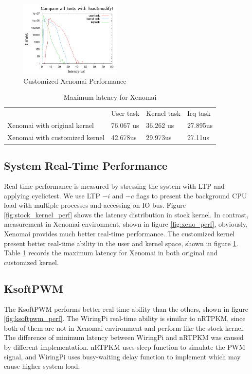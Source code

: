 \documentclass[conference]{IEEEtran}
\begin{document}
\begin{figure}
	\centering
	\includegraphics[width=2in]{img/xenomai_load_modify.png}
	\caption{Customized Xenomai Performance}
	\label{fig:xeno_perf_modify}
\end{figure}

\begin{table}[]
\centering
\caption{Maximum latency for Xenomai}
\label{xeno_compare}
\begin{tabular}{llll}
                              & User task & Kernel task & Irq task \\
Xenomai with original kernel  & 76.067 us & 36.262 us   & 27.895us \\
Xenomai with customized kernel & 42.678us  & 29.973us    & 27.11us 
\end{tabular}
\end{table}

\subsection{System Real-Time Performance}

Real-time performance is measured by stressing the system with LTP and applying cyclictest. We use LTP $-i$ and $-c$ flags to present the background CPU load with multiple processes and accessing on IO bus. Figure \ref{fig:stock_kernel_perf} shows the latency distribution in stock kernel. In contrast, measurement in Xenomai environment, shown in figure \ref{fig:xeno_perf}, obviously, Xenomai provides much better real-time performance. The customized kernel present better real-time ability in the user and kernel space, shown in figure \ref{fig:xeno_perf_modify}. Table \ref{xeno_compare} records the maximum latency for Xenomai in both original and customized kernel.

\subsection{KsoftPWM}

The KsoftPWM performs better real-time ability than the others, shown in figure \ref{fig:ksoftpwm_perf}. The WiringPi real-time ability is similar to nRTPKM, since both of them are not in Xenomai environment and perform like the stock kernel. The difference of minimum latency between WiringPi and nRTPKM was caused by different implementation. nRTPKM uses sleep function to simulate the PWM signal, and WiringPi uses busy-waiting delay function to implement which may cause higher system load.
\end{document}
